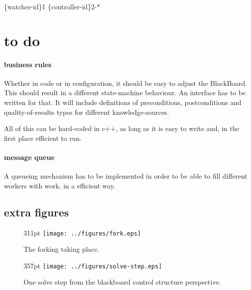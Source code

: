 \documentclass[]{lofar}
\begin{document}
        \{watcher-id\}1 \{controller-id\}2-*

  \section{to do}
  \label{sec:todo}\hypertarget{sec:todo}{}

    \paragraph{business rules}
      Whether in code or in configuration, it should be easy to adjust
      the BlackBoard. This should result in a different state-machine
      behaviour. An interface has to be written for that. It will
      include definitions of preconditions, postconditions and
      quality-of-results types for different knowledge-sources.

      All of this can be hard-coded in c++, as long as it is easy to
      write and, in the first place efficient to run.

    \paragraph{message queue}
      A queueing mechanism has to be implemented in order to be able
      to fill different workers with work, in a efficient way.

    \subsection{extra figures}

    \begin{figure}{311pt}
      \texttt{[image: ../figures/fork.eps]}
      \hypertarget{fig:fork}{}
      \caption{The forking taking place.\label{fig:fork}}
    \end{figure}

    \begin{figure}{357pt}
      \texttt{[image: ../figures/solve-step.eps]}
      \hypertarget{fig:solve-step}{}
      \caption{One solve step from the blackboard control structure perspective.\label{fig:solve-step}}
    \end{figure}

\end{document}
